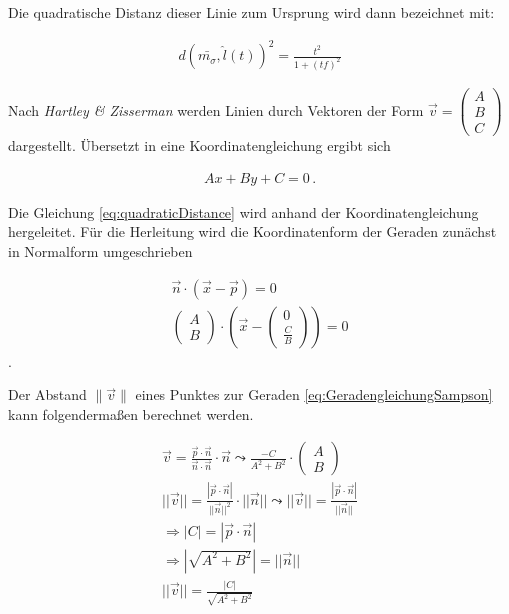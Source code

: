 Die quadratische Distanz dieser Linie zum Ursprung wird dann bezeichnet mit:


\begin{gather}
	d(\bar{m_\sigma},\hat{l}(t))^2 = \frac{t^2}{1+(tf)^2} \label{eq:quadraticDistance}
\end{gather}

Nach \textit{Hartley \& Zisserman} \cite{HZ} werden Linien durch Vektoren der Form $\vec{v} = \begin{pmatrix}
A\\B\\C
\end{pmatrix}$ dargestellt. Übersetzt in eine Koordinatengleichung ergibt sich

\begin{gather}
	Ax+By+C = 0 \, .
\end{gather}

Die Gleichung \ref{eq:quadraticDistance} wird anhand der Koordinatengleichung hergeleitet. Für die Herleitung wird die Koordinatenform der Geraden zunächst in Normalform umgeschrieben

%

\begin{gather}
\vec{n}\cdot (\vec{x} - \vec{p}) = 0\\
	\begin{pmatrix}
	A\\B
	\end{pmatrix}
	\cdot
	\left(\vec{x} - \begin{pmatrix}
		0\\ \frac{C}{B}
	\end{pmatrix}\right) = 0\label{eq:GeradengleichungSampson}
\end{gather} .

Der Abstand $\parallel \vec{v} \parallel$ eines Punktes zur Geraden \ref{eq:GeradengleichungSampson} kann folgendermaßen berechnet werden.

\begin{gather}
	\vec{v} = \frac{\vec{p} \cdot \vec{n}}{\vec{n} \cdot \vec{n}} \cdot \vec{n}
	\leadsto \frac{-C}{A^2+B^2} \cdot \begin{pmatrix}
	A\\B
	\end{pmatrix}\\
	||\vec{v}|| = \frac{|\vec{p} \cdot \vec{n}|}{||\vec{n}||^2} \cdot ||\vec{n}|| \leadsto ||\vec{v}|| = \frac{|\vec{p} \cdot \vec{n}|}{||\vec{n}||}\\
	\Rightarrow |C| = |\vec{p} \cdot \vec{n}| \\
	\Rightarrow |\sqrt{A^2+B^2}| = ||\vec{n}||\\
	||\vec{v}|| = \frac{|C|}{\sqrt{A^2+B^2}}
\end{gather}


